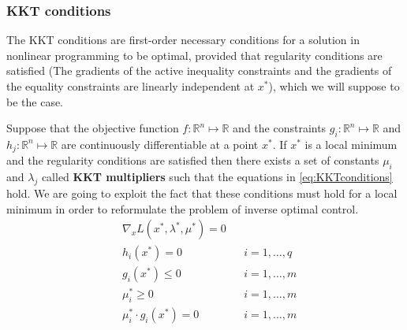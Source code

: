 \documentclass[12pt, a4paper]{article}
\begin{document}
\subsubsection{KKT conditions}
The KKT conditions are first-order necessary conditions for a solution in nonlinear programming to be optimal, provided that regularity conditions are satisfied (The gradients of the active inequality constraints and the gradients of the equality constraints are linearly independent at \(x^{*}\)), which we will suppose to be the case. \par
Suppose that the objective function \( f : \mathbb{R}^n \mapsto \mathbb{R} \) and the constraints \(g_i : \mathbb{R}^n \mapsto \mathbb{R} \) and \( h_j : \mathbb{R}^n \mapsto \mathbb{R} \) are continuously differentiable at a point \( x^* \). If \( x^*\) is a local minimum and the regularity conditions are satisfied then there exists a set of constants \( \mu_i \) and \( \lambda_j \) called \textbf{KKT multipliers} such that the equations in \eqref{eq:KKTconditions} hold. We are going to exploit the fact that these conditions must hold for a local minimum in order to reformulate the problem of inverse optimal control.
\begin{subequations} \label{eq:KKTconditions}
    \begin{align}
    &\nabla_x L(x^*, \lambda^*, \mu^*) = 0 & & \label{eq:Stationarity}\\
    &h_i(x^*) = 0 & & i=1,\ldots,q \label{eq:PrimalFeasibilityEq}\\
    &g_i(x^*) \leq 0 & & i=1,\ldots,m \label{eq:PrimalFeasibilityIneq}\\
    &\mu_i^* \geq 0 & & i=1,\ldots,m \label{eq:DualFeasibility}\\
    &\mu_i^* \cdot g_i(x^*) = 0 & & i=1,\ldots,m \label{eq:ComplementarySlackness}
    \end{align}
\end{subequations}
\end{document}
